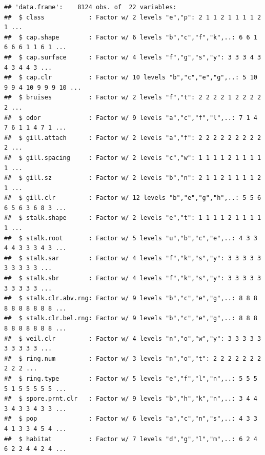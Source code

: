 \documentclass[
  english,
  man]{apa6}
\newenvironment{Shaded}{\begin{snugshade}}{\end{snugshade}}
\newcommand{\CommentTok}[1]{\textcolor[rgb]{0.56,0.35,0.01}{\textit{#1}}}
\newcommand{\DataTypeTok}[1]{\textcolor[rgb]{0.13,0.29,0.53}{#1}}
\newcommand{\KeywordTok}[1]{\textcolor[rgb]{0.13,0.29,0.53}{\textbf{#1}}}
\newcommand{\NormalTok}[1]{#1}
\newcommand{\OperatorTok}[1]{\textcolor[rgb]{0.81,0.36,0.00}{\textbf{#1}}}
\newcommand{\StringTok}[1]{\textcolor[rgb]{0.31,0.60,0.02}{#1}}
\begin{document}
\begin{Shaded}
\end{Shaded}

\begin{verbatim}
## 'data.frame':    8124 obs. of  22 variables:
##  $ class            : Factor w/ 2 levels "e","p": 2 1 1 2 1 1 1 1 2 1 ...
##  $ cap.shape        : Factor w/ 6 levels "b","c","f","k",..: 6 6 1 6 6 6 1 1 6 1 ...
##  $ cap.surface      : Factor w/ 4 levels "f","g","s","y": 3 3 3 4 3 4 3 4 4 3 ...
##  $ cap.clr          : Factor w/ 10 levels "b","c","e","g",..: 5 10 9 9 4 10 9 9 9 10 ...
##  $ bruises          : Factor w/ 2 levels "f","t": 2 2 2 2 1 2 2 2 2 2 ...
##  $ odor             : Factor w/ 9 levels "a","c","f","l",..: 7 1 4 7 6 1 1 4 7 1 ...
##  $ gill.attach      : Factor w/ 2 levels "a","f": 2 2 2 2 2 2 2 2 2 2 ...
##  $ gill.spacing     : Factor w/ 2 levels "c","w": 1 1 1 1 2 1 1 1 1 1 ...
##  $ gill.sz          : Factor w/ 2 levels "b","n": 2 1 1 2 1 1 1 1 2 1 ...
##  $ gill.clr         : Factor w/ 12 levels "b","e","g","h",..: 5 5 6 6 5 6 3 6 8 3 ...
##  $ stalk.shape      : Factor w/ 2 levels "e","t": 1 1 1 1 2 1 1 1 1 1 ...
##  $ stalk.root       : Factor w/ 5 levels "u","b","c","e",..: 4 3 3 4 4 3 3 3 4 3 ...
##  $ stalk.sar        : Factor w/ 4 levels "f","k","s","y": 3 3 3 3 3 3 3 3 3 3 ...
##  $ stalk.sbr        : Factor w/ 4 levels "f","k","s","y": 3 3 3 3 3 3 3 3 3 3 ...
##  $ stalk.clr.abv.rng: Factor w/ 9 levels "b","c","e","g",..: 8 8 8 8 8 8 8 8 8 8 ...
##  $ stalk.clr.bel.rng: Factor w/ 9 levels "b","c","e","g",..: 8 8 8 8 8 8 8 8 8 8 ...
##  $ veil.clr         : Factor w/ 4 levels "n","o","w","y": 3 3 3 3 3 3 3 3 3 3 ...
##  $ ring.num         : Factor w/ 3 levels "n","o","t": 2 2 2 2 2 2 2 2 2 2 ...
##  $ ring.type        : Factor w/ 5 levels "e","f","l","n",..: 5 5 5 5 1 5 5 5 5 5 ...
##  $ spore.prnt.clr   : Factor w/ 9 levels "b","h","k","n",..: 3 4 4 3 4 3 3 4 3 3 ...
##  $ pop              : Factor w/ 6 levels "a","c","n","s",..: 4 3 3 4 1 3 3 4 5 4 ...
##  $ habitat          : Factor w/ 7 levels "d","g","l","m",..: 6 2 4 6 2 2 4 4 2 4 ...
\end{verbatim}
\end{document}
